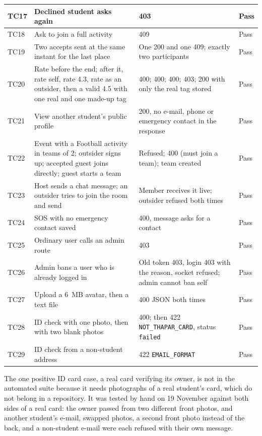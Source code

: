\begin{longtable}{|p{1.0cm}|L{4.2cm}|L{4.4cm}|p{1.4cm}|}
TC17 & Declined student asks again & 403 & Pass \\ \hline
TC18 & Ask to join a full activity & 409 & Pass \\ \hline
TC19 & Two accepts sent at the same instant for the last place & One 200 and one 409; exactly two participants & Pass \\ \hline
TC20 & Rate before the end; after it, rate self, rate 4.3, rate as an outsider, then a valid 4.5 with one real and one made-up tag & 400; 400; 400; 403; 200 with only the real tag stored & Pass \\ \hline
TC21 & View another student's public profile & 200, no e-mail, phone or emergency contact in the response & Pass \\ \hline
TC22 & Event with a Football activity in teams of 2; outsider signs up; accepted guest joins directly; guest starts a team & Refused; 400 (must join a team); team created & Pass \\ \hline
TC23 & Host sends a chat message; an outsider tries to join the room and send & Member receives it live; outsider refused both times & Pass \\ \hline
TC24 & SOS with no emergency contact saved & 400, message asks for a contact & Pass \\ \hline
TC25 & Ordinary user calls an admin route & 403 & Pass \\ \hline
TC26 & Admin bans a user who is already logged in & Old token 403, login 403 with the reason, socket refused; admin cannot ban self & Pass \\ \hline
TC27 & Upload a 6~MB avatar, then a text file & 400 JSON both times & Pass \\ \hline
TC28 & ID check with one photo, then with two blank photos & 400; then 422 \texttt{NOT\_THAPAR\_CARD}, status \texttt{failed} & Pass \\ \hline
TC29 & ID check from a non-student address & 422 \texttt{EMAIL\_FORMAT} & Pass \\ \hline
\end{longtable}

\noindent The one positive ID card case, a real card verifying its owner, is not in the
automated suite because it needs photographs of a real student's card, which do not belong
in a repository. It was tested by hand on 19 November against both sides of a real card:
the owner passed from two different front photos, and another student's e-mail, swapped
photos, a second front photo instead of the back, and a non-student e-mail were each refused
with their own message.

